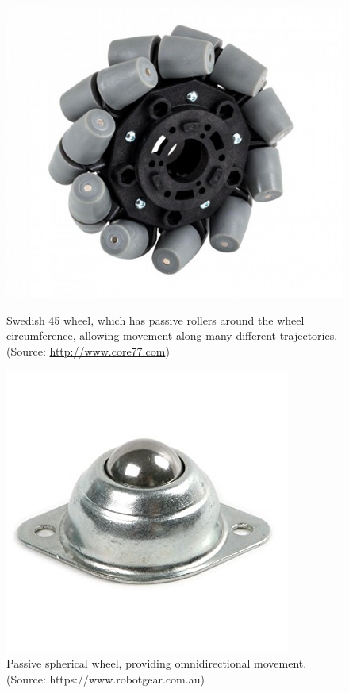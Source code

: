 \documentclass[a4paper]{article}
\begin{document}
\begin{figure}[h]
\centering
\begin{minipage}[t]{0.45\textwidth}
\centering
\includegraphics[scale=0.25]{omni_wheel}
\caption{Swedish 45 wheel, which has passive rollers around the wheel circumference, allowing movement along many different trajectories. (Source: \protect\url{http://www.core77.com})}
\end{minipage}
\hspace{1cm}
\begin{minipage}[t]{0.45\textwidth}
\centering
\includegraphics[scale=0.3]{ball_bearing}
\caption{Passive spherical wheel, providing omnidirectional movement. (Source: https://www.robotgear.com.au)}
\end{minipage}
\end{figure}
\end{document}
